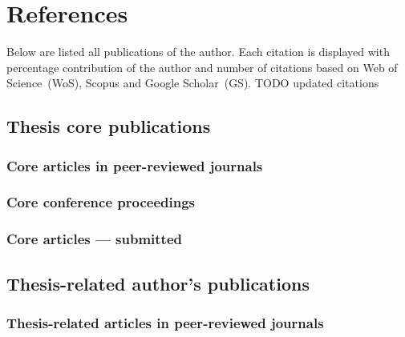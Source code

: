 \documentclass[a4paper,11pt,titlepage,twoside]{book}
\newcommand{\todo}[1]{{\color{red} TODO {#1}}}
\newcommand{\chapternoclear}[1]{
  \begingroup
  \let\cleardoublepage\clearpage
  \chapter{#1}
  \endgroup
}
\begin{document}
\chapternoclear{References}

Below are listed all publications of the author.
Each citation is displayed with percentage contribution of the author and number of citations based on Web of Science~(WoS), Scopus and Google Scholar~(GS).
\todo{updated citations}

\section{Thesis core publications}

\subsection*{Core articles in peer-reviewed journals}
\printbibliography[keyword={mine},keyword={phd_related},keyword={journal},keyword={core},notkeyword={submitted},heading=none,title={}]

\subsection*{Core conference proceedings}
\printbibliography[keyword={mine},keyword={phd_related},keyword={conference},keyword={core},notkeyword={submitted},heading=none,title={}]

\subsection*{Core articles --- submitted}
\printbibliography[keyword={mine},keyword={phd_related},keyword={submitted},keyword={core},heading=none,title={}]

\section{Thesis-related author's publications}

\subsection*{Thesis-related articles in peer-reviewed journals}
\printbibliography[keyword={mine},keyword={phd_related},keyword={journal},notkeyword={core},notkeyword={submitted},heading=none,title={}]
\end{document}
